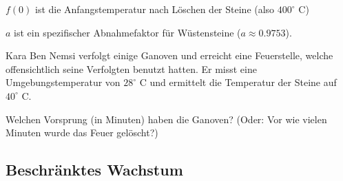 $f(0)$ ist die Anfangstemperatur nach Löschen der Steine (also $400^\circ$ C)

$a$ ist ein spezifischer Abnahmefaktor für Wüstensteine ($a\approx 0.9753$).


Kara Ben Nemsi verfolgt einige Ganoven und erreicht eine Feuerstelle, welche offensichtlich seine Verfolgten benutzt hatten. Er misst eine Umgebungstemperatur von $28^\circ$ C und ermittelt die Temperatur der Steine auf $40^\circ$ C.

Welchen Vorsprung (in Minuten) haben die Ganoven? (Oder: Vor wie vielen Minuten wurde das Feuer gelöscht?)


\platzFuerBerechnungenBisEndeSeite{}






\subsection{Beschränktes Wachstum}




